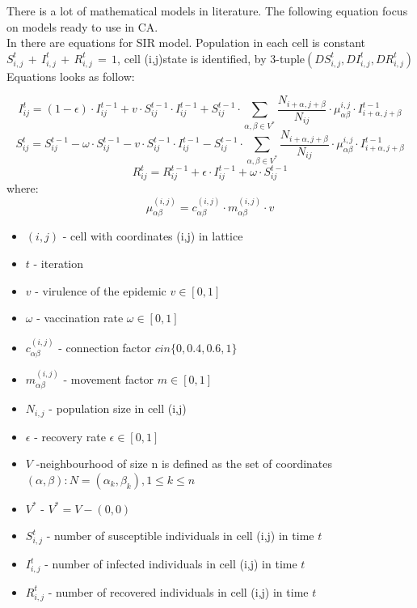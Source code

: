 \documentclass[a4paper, 11pt]{article}
\begin{document}
	
	
	There is a lot of mathematical models in literature. The following equation focus on models ready to use in CA.\\
	In \cite{WHITE} there are equations for SIR model. Population in each cell is constant $S^{t}_{i,j}\,+\,I^{t}_{i,j}\,+\,R^{t}_{i,j}\,=\,1$, cell (i,j)state is identified, by 3-tuple$(DS^{t}_{i,j},DI^{t}_{i,j},DR^{t}_{i,j})$ Equations looks as follow:
	
	\begin{equation}
	I^t_{ij}=\left(1-\epsilon\right)\cdot I^{t-1}_{ij}+v\cdot S^{t-1}_{ij}\cdot I^{t-1}_{ij}+S^{t-1}_{ij} \cdot \sum\limits_{\alpha,\beta\in V^{*}}\frac{N_{i+\alpha,j+\beta}}{N_{ij}}\cdot \mu^{i,j}_{\alpha\beta}\cdot I^{t-1}_{i+\alpha,j+\beta} 
	\end{equation}		
		\begin{equation}
	S^t_{ij}=S^{t-1}_{ij}-\omega\cdot S^{t-1}_{ij}-v\cdot S^{t-1}_{ij}\cdot I^{t-1}_{ij}-S^{t-1}_{ij} \cdot \sum\limits_{\alpha,\beta\in V^{*}}\frac{N_{i+\alpha,j+\beta}}{N_{ij}}\cdot \mu^{i,j}_{\alpha\beta}\cdot I^{t-1}_{i+\alpha,j+\beta} 
\end{equation}	
	\begin{equation}
	R^t_{ij}=R^{t-1}_{ij}+\epsilon\cdot I^{t-1}_{ij}+\omega\cdot S^{t-1}_{ij}
\end{equation}	
	where:
		\begin{equation}
	\mu^{(i,j)}_{\alpha\beta}= c^{(i,j)}_{\alpha\beta}\cdot m^{(i,j)}_{\alpha\beta} \cdot v
\end{equation}
	\begin{itemize}
	\item $(i,j)$ - cell with coordinates (i,j) in lattice
	\item $t$ - iteration
	\item $v$ - virulence of the epidemic  $v \in \left[0,1\right]$
	\item $\omega$ -  vaccination rate $\omega \in \left[0,1\right]$
	\item $c^{(i,j)}_{\alpha\beta}$ - connection factor $c in \{0,0.4,0.6,1 \}$
	\item $ m^{(i,j)}_{\alpha\beta}$ - movement factor $m \in \left[0,1\right]$
	\item $N_{i,j}$ - population size in cell (i,j)
	\item $\epsilon$ - recovery rate $\epsilon \in \left[0,1\right]$
	\item $V$ -neighbourhood of size n is defined as the set of coordinates $(\alpha,\beta): N={(\alpha_k,\beta_k),1\leq k \leq n}$
	\item $V^{*}$ - $ V^{*}= V-{(0,0)} $ 
	\item $S^{t}_{i,j}$ - number of susceptible individuals in cell (i,j) in time $t$
	\item $I^{t}_{i,j}$ - number of infected individuals in cell (i,j) in time $t$
	\item $R^{t}_{i,j}$ - number of recovered individuals in cell (i,j) in time $t$
	\end{itemize}	
	
\end{document}
